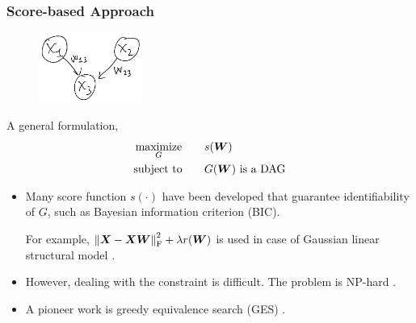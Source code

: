 \documentclass[10pt,xcolor={usenames,dvipsnames,table}]{beamer}
\begin{document}
\begin{frame}
    \frametitle{Score-based Approach}
    \begin{figure}
        \centering
        \includegraphics[width=0.3\textwidth]{figures/graph.jpg}
    \end{figure}
    A general formulation,
    \begin{alignat*}{2}
        & \operatorname*{maximize}_{G} \quad && s(\bm{W}) \\
        & \text{\rm subject to} && G(\bm{W}) \text{ is a DAG} 
    \end{alignat*}

    \begin{itemize}
        \item Many score function $s(\cdot)$ have been developed that guarantee identifiability of $G$, such as Bayesian information criterion (BIC).

            For example,
        $\left\lVert\bm{X} - \bm{X}\bm{W}\right\rVert_{\rm F}^2 + \lambda r(\bm{W})$ is used in case of Gaussian linear structural model \citep{van2013ell_}.
        \item However, dealing with the constraint is difficult. The problem is NP-hard \citep{chickering2004large}.
        \item A pioneer work is greedy equivalence search (GES) \citep{chickering2002optimal}. 
    \end{itemize}
\end{frame}
\end{document}
